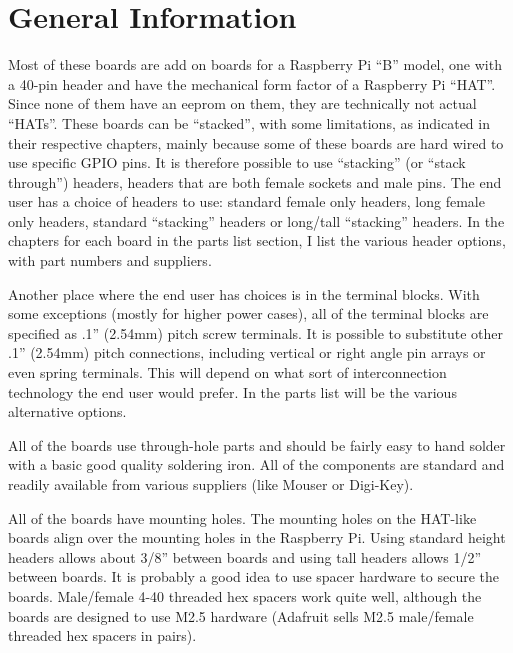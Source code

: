 \documentclass[12pt,notitlepage,twoside]{book}
\begin{document}
\chapter{General Information}

Most of these boards are add on boards for a Raspberry Pi ``B'' model, 
one with a 40-pin header and have the mechanical form factor of a Raspberry Pi 
``HAT''.  Since none of them have an eeprom on them, they are technically not 
actual ``HATs''.  These boards can be ``stacked'', with some limitations, as 
indicated in their respective chapters, mainly because some of these boards 
are hard wired to use specific GPIO pins.  It is therefore possible to use 
``stacking'' (or ``stack through'') headers, headers that are both female 
sockets and male pins.  The end user has a choice of headers to use: standard 
female only headers, long female only headers, standard ``stacking'' headers 
or long/tall ``stacking'' headers.  In the chapters for each board in the 
parts list section, I list the various header options, with part numbers and 
suppliers.

Another place where the end user has choices is in the terminal blocks.  With 
some exceptions (mostly for higher power cases), all of the terminal blocks 
are specified as .1'' (2.54mm) pitch screw terminals.  It is possible to 
substitute other .1'' (2.54mm) pitch connections, including vertical or right 
angle pin arrays or even spring terminals.  This will depend on what sort of 
interconnection technology the end user would prefer.  In the parts list will 
be the various alternative options.

All of the boards use through-hole parts and should be fairly easy to hand 
solder with a basic good quality soldering iron.  All of the components are 
standard and readily available from various suppliers (like Mouser or 
Digi-Key).

All of the boards have mounting holes.  The mounting holes on the HAT-like 
boards align over the mounting holes in the Raspberry Pi.  Using standard 
height headers allows about 3/8'' between boards and using tall headers allows 
1/2'' between boards.  It is probably a good idea to use spacer hardware to 
secure the boards.  Male/female 4-40 threaded hex spacers work quite well, 
although the boards are designed to use M2.5 hardware (Adafruit sells M2.5 
male/female threaded hex spacers in pairs).
















\cleardoublepage
%
%
\cleardoublepage
\printindex
\end{document}
